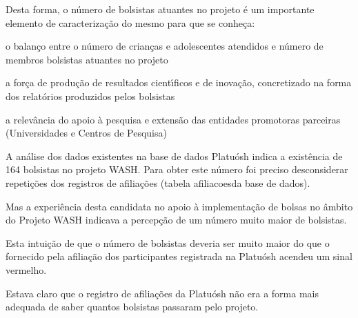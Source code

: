 \documentclass[
12pt,		%
openright,	%
twoside,  %
a4paper,			%
chapter=TITLE,		%
english,			%
french,				%
spanish,			%
brazil				%
]{USPSC-classe/USPSC_RedarTex}
\begin{document}
Desta forma, o n\'umero de bolsistas atuantes no projeto \'e um importante elemento de caracteriza\c{c}\~ao do mesmo para que se conhe\c{c}a:









\begin{alineas}
\item o balan\c{c}o entre o n\'umero de crian\c{c}as e adolescentes atendidos e n\'umero de membros bolsistas atuantes no projeto
\item a for\c{c}a de produ\c{c}\~ao de resultados cient\'{\i}ficos e de inova\c{c}\~ao, concretizado na forma dos relat\'orios produzidos pelos bolsistas
\item a relev\^ancia do apoio \`a pesquisa e extens\~ao das entidades promotoras parceiras (Universidades e Centros de Pesquisa)
\end{alineas}

A an\'alise dos dados existentes na base de dados Platu\'osh indica a exist\^encia de 164 bolsistas no projeto WASH. Para obter este n\'umero foi preciso desconsiderar repeti\c{c}\~oes dos registros de afilia\c{c}\~oes (tabela \textquotedbl afiliacoes\textquotedbl  da base de dados).








Mas a experi\^encia desta candidata no apoio \`a implementa\c{c}\~ao de bolsas no \^ambito do Projeto WASH indicava a percep\c{c}\~ao de um n\'umero muito maior de bolsistas.








Esta intui\c{c}\~ao de que o n\'umero de bolsistas deveria ser muito maior do que o fornecido pela afilia\c{c}\~ao dos participantes registrada na Platu\'osh acendeu um sinal vermelho.








Estava claro que o registro de afilia\c{c}\~oes da Platu\'osh n\~ao era a forma mais adequada de saber quantos bolsistas passaram pelo projeto.
\end{document}
